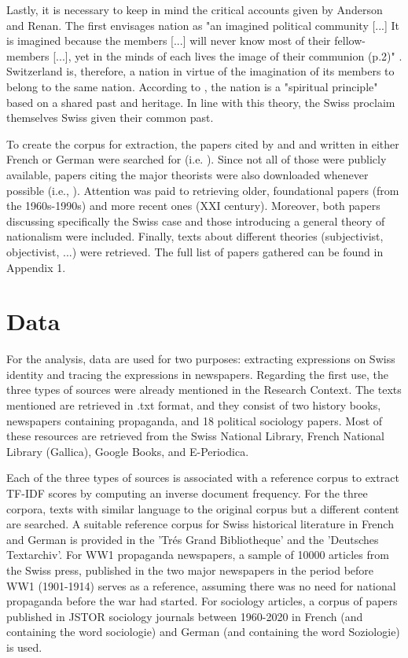 \documentclass[11pt]{article}
\begin{document}
Lastly, it is necessary to keep in mind the critical accounts given by Anderson and Renan. The first envisages nation as "an imagined political community [...] It is imagined because the members [...] will never know most of their fellow-members [...], yet in the minds of each lives the image of their communion (p.2)" \citep{anderson2006imagined}. Switzerland is, therefore, a nation in virtue of the imagination of its members to belong to the same nation. According to \cite{renan1882qu}, the nation is a "spiritual principle" based on a shared past and heritage. In line with this theory, the Swiss proclaim themselves Swiss given their common past.
\par
To create the corpus for extraction, the papers cited by \cite{wimmer2011swiss} and \cite{helbling2011switzerland} and written in either French or German were searched for (i.e. \cite{imhof1993nationalismus}). Since not all of those were publicly available, papers citing the major theorists were also downloaded whenever possible (i.e., \cite{godechot1971nation}). Attention was paid to retrieving older, foundational papers (from the 1960s-1990s) and more recent ones (XXI century). Moreover, both papers discussing specifically the Swiss case and those introducing a general theory of nationalism were included. Finally, texts about different theories (subjectivist, objectivist, ...) were retrieved. The full list of papers gathered can be found in Appendix 1. 

\section{Data}

For the analysis, data are used for two purposes: extracting expressions on Swiss identity and tracing the expressions in newspapers. Regarding the first use, the three types of sources were already mentioned in the Research Context. The texts mentioned are retrieved in .txt format, and they consist of two history books, newspapers containing propaganda, and 18 political sociology papers. Most of these resources are retrieved from the Swiss National Library, French National Library (Gallica), Google Books, and E-Periodica. \par

Each of the three types of sources is associated with a reference corpus to extract TF-IDF scores by computing an inverse document frequency. For the three corpora, texts with similar language to the original corpus but a different content are searched. A suitable reference corpus for Swiss historical literature in French and German is provided in the 'Trés Grand Bibliotheque' \citep{TresGrandBibliotheque} and the 'Deutsches Textarchiv'\citep{DeutscheTextArchive}. For WW1 propaganda newspapers, a sample of 10000 articles from the Swiss press, published in the two major newspapers in the period before WW1 (1901-1914) serves as a reference, assuming there was no need for national propaganda before the war had started. For sociology articles, a corpus of papers published in JSTOR sociology journals between 1960-2020 in French (and containing the word sociologie) and German (and containing the word Soziologie) is used. \par
\end{document}
